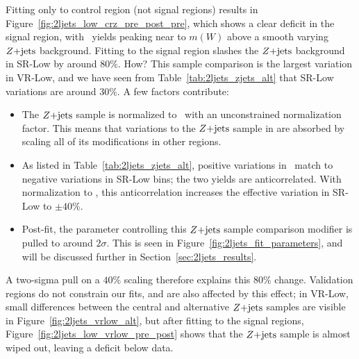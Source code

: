 Fitting only to control region (not signal regions) results in
Figure~\ref{fig:2ljets_low_crz_pre_post_pre}, which shows a clear deficit in
the signal region, with \diboson\ yields peaking near to $m(W)$ above a smooth
varying $Z\mathrm{+jets}$ background.
Fitting to the signal region slashes the $Z\mathrm{+jets}$ background in SR-Low by
around $80\%$. How?
This sample comparison is the largest variation in VR-Low, and we have seen
from Table~\ref{tab:2ljets_zjets_alt} that SR-Low variations are around $30\%$.
A few factors contribute:
\begin{itemize}
\item The $Z\mathrm{+jets}$ sample is normalized to \crz\ with an unconstrained
normalization factor. This means that variations to the $Z\mathrm{+jets}$ sample in \crz
are absorbed by scaling all of its modifications in other regions.
\item As listed in Table~\ref{tab:2ljets_zjets_alt}, positive variations
in \crz\ match to negative variations in SR-Low bins; the two yields are
anticorrelated.
With normalization to \crz, this anticorrelation increases the effective
variation in SR-Low to $\pm40\%$.
\item Post-fit, the parameter controlling this $Z\mathrm{+jets}$ sample comparison
modifier is pulled to around $2\sigma$. This is seen in
Figure~\ref{fig:2ljets_fit_parameters}, and will be discussed further in
Section~\ref{sec:2ljets_results}.
\end{itemize}
A two-sigma pull on a $40\%$ scaling therefore explains this $80\%$ change.
Validation regions do not constrain our fits, and are also affected by
this effect; in VR-Low, small differences between the central and alternative
$Z\mathrm{+jets}$ samples are visible in Figure~\ref{fig:2ljets_vrlow_alt}, but
after fitting to the signal regions,
Figure~\ref{fig:2ljets_low_vrlow_pre_post} shows that the $Z\mathrm{+jets}$ sample
is almost wiped out, leaving a deficit below data.

